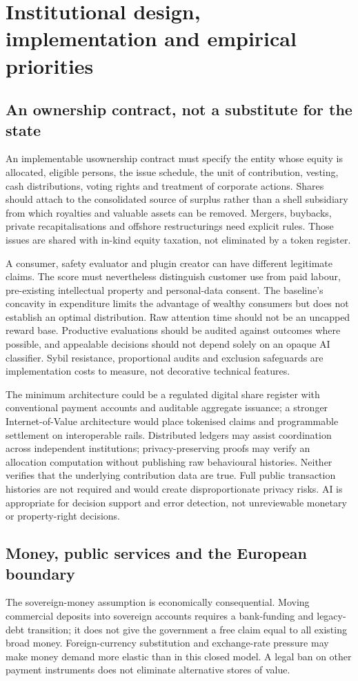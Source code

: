 \section{Institutional design, implementation and empirical priorities}
\subsection{An ownership contract, not a substitute for the state}
An implementable usownership contract must specify the entity whose equity is allocated, eligible persons, the issue schedule, the unit of contribution, vesting, cash distributions, voting rights and treatment of corporate actions. Shares should attach to the consolidated source of surplus rather than a shell subsidiary from which royalties and valuable assets can be removed. Mergers, buybacks, private recapitalisations and offshore restructurings need explicit rules. Those issues are shared with in-kind equity taxation, not eliminated by a token register.

A consumer, safety evaluator and plugin creator can have different legitimate claims. The score must nevertheless distinguish customer use from paid labour, pre-existing intellectual property and personal-data consent. The baseline's concavity in expenditure limits the advantage of wealthy consumers but does not establish an optimal distribution. Raw attention time should not be an uncapped reward base. Productive evaluations should be audited against outcomes where possible, and appealable decisions should not depend solely on an opaque AI classifier. Sybil resistance, proportional audits and exclusion safeguards are implementation costs to measure, not decorative technical features.

The minimum architecture could be a regulated digital share register with conventional payment accounts and auditable aggregate issuance; a stronger Internet-of-Value architecture would place tokenised claims and programmable settlement on interoperable rails. Distributed ledgers may assist coordination across independent institutions; privacy-preserving proofs may verify an allocation computation without publishing raw behavioural histories. Neither verifies that the underlying contribution data are true. Full public transaction histories are not required and would create disproportionate privacy risks. AI is appropriate for decision support and error detection, not unreviewable monetary or property-right decisions.

\subsection{Money, public services and the European boundary}
The sovereign-money assumption is economically consequential. Moving commercial deposits into sovereign accounts requires a bank-funding and legacy-debt transition; it does not give the government a free claim equal to all existing broad money. Foreign-currency substitution and exchange-rate pressure may make money demand more elastic than in this closed model. A legal ban on other payment instruments does not eliminate alternative stores of value.

